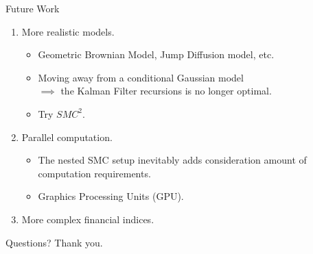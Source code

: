 \documentclass[handout]{beamer}
\begin{document}
\begin{frame}{Future Work}
\begin{enumerate}
\item More realistic models.
  \begin{itemize}
   \item Geometric Brownian Model, Jump Diffusion model, etc.
   \item Moving away from a conditional Gaussian model \\$\implies$ the  Kalman Filter recursions is no longer optimal.
   \item Try $SMC^2$.
  \end{itemize}
\item Parallel computation.
  \begin{itemize}
   \item The nested SMC setup inevitably adds consideration amount of computation requirements. 
   \item Graphics Processing Units (GPU).
  \end{itemize}
\item More complex financial indices.
\end{enumerate}
\end{frame}

\begin{frame}{Questions?}
Thank you.
\end{frame}
\end{document}
